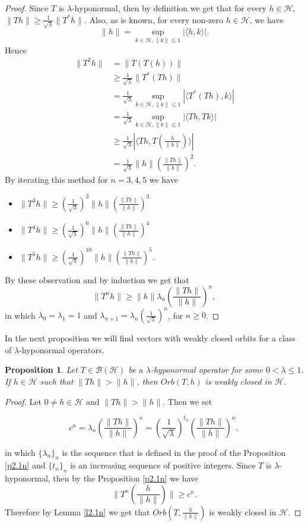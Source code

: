 \documentclass{amsart}
\newtheorem{prop}[thm]{Proposition}
\theoremstyle{definition}\newtheorem{defn}[thm]{Definition}
\theoremstyle{remark}
\numberwithin{equation}{section}
\begin{document}
\begin{proof}
Since $T$ is $\lambda$-hyponormal, then by definition we get that for every $h\in \mathcal{H}$,
$\|Th\|\geq \frac{1}{\sqrt{\lambda}}\|T^*h\|$.
Also, as is known, for every non-zero $h\in \mathcal{H}$, we have 
$$\|h\|=\sup_{k\in\mathcal{H},\|k\|\leq 1}|\langle h,k\rangle|.$$
Hence 
\begin{align*}
\|T^2h\|&=\|T(T(h))\|\\
&\geq \frac{1}{\sqrt{\lambda}}\|T^*(Th)\|\\
&=\frac{1}{\sqrt{\lambda}}\sup_{k\in\mathcal{H},\|k\|\leq 1}|\langle T^*(Th),k\rangle|\\
&=\frac{1}{\sqrt{\lambda}}\sup_{k\in\mathcal{H},\|k\|\leq 1}|\langle Th,Tk\rangle|\\
&\geq\frac{1}{\sqrt{\lambda}}|\langle Th,T(\frac{h}{\|h\|})\rangle|\\
&=\frac{1}{\sqrt{\lambda}}\|h\|\left(\frac{\|Th\|}{\|h\|}\right)^2.
\end{align*}
By iterating this method for $n=3,4,5$ we have 
\begin{itemize}
  \item $\|T^3h\|\geq \left(\frac{1}{\sqrt{\lambda}}\right)^3\|h\|\left(\frac{\|Th\|}{\|h\|}\right)^3$
  \item $\|T^4h\|\geq \left(\frac{1}{\sqrt{\lambda}}\right)^6\|h\|\left(\frac{\|Th\|}{\|h\|}\right)^4$
  \item $\|T^5h\|\geq \left(\frac{1}{\sqrt{\lambda}}\right)^{10}\|h\|\left(\frac{\|Th\|}{\|h\|}\right)^{5}$.
\end{itemize}
By these observation and by induction we get that 
$$\|T^nh\|\geq \|h\|\lambda_n\left(\frac{\|Th\|}{\|h\|}\right)^n,$$
in which $\lambda_0=\lambda_1=1$ and $\lambda_{n+1}=\lambda_n \left(\frac{1}{\sqrt{\lambda}}\right)^n$, for $n\geq 0$.
\end{proof}
In the next proposition we will find vectors with weakly closed orbits for a class of $\lambda$-hyponormal operators.
\begin{prop}\label{p2.3n}
Let $T\in \mathcal{B}(\mathcal{H})$ be a $\lambda$-hyponormal operator for some $0<\lambda\leq 1$. If $h\in \mathcal{H}$ such that $\|Th\|>\|h\|$, then $Orb(T,h)$ is weakly closed in $\mathcal{H}$.
\end{prop}
\begin{proof}
Let $0\neq h\in \mathcal{H}$ and $\|Th\|>\|h\|$. Then we set 

$$c^n=\lambda_n\left(\frac{\|Th\|}{\|h\|}\right)^n=\left(\frac{1}{\sqrt{\lambda}}\right)^{t_n}\left(\frac{\|Th\|}{\|h\|}\right)^n,$$

in which $\{\lambda_n\}_n$ is the sequence that is defined in the proof of the Proposition \ref{p2.1n} and $\{t_n\}_n$ is an increasing sequence of positive integers. Since $T$ is $\lambda$-hyponormal, then by the Proposition \ref{p2.1n} we have 
$$\|T^n(\frac{h}{\|h\|})\|\geq c^n.$$
Therefore by Lemma \ref{l2.1n} we get that $Orb(T,\frac{h}{\|h\|})$ is weakly closed in $\mathcal{H}$.  
\end{proof}
\end{document}
